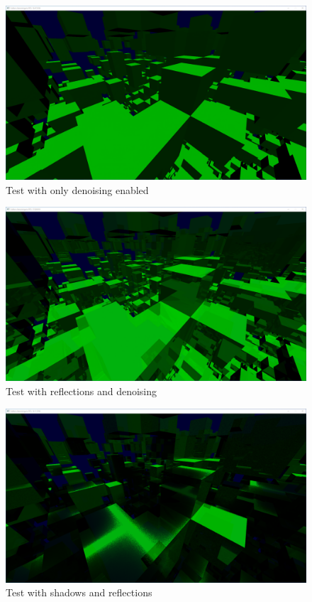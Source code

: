 \documentclass[times, utf8, zavrsni, numeric]{fer}
\begin{document}
\begin{center}
\begin{figure}[H]
\includegraphics[width=1\textwidth]{tests/denoising_only.png}
\caption{Test with only denoising enabled}
\end{figure}
\end{center}

\begin{center}
\begin{figure}[H]
\includegraphics[width=1\textwidth]{tests/reflections+denoising.png}
\caption{Test with reflections and denoising}
\end{figure}
\end{center}

\begin{center}
\begin{figure}[H]
\includegraphics[width=1\textwidth]{tests/shadows+reflections.png}
\caption{Test with shadows and reflections}
\end{figure}
\end{center}
\end{document}
